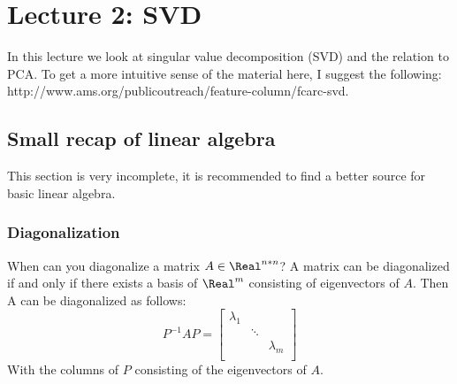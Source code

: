 \chapter{Lecture 2: SVD}
In this lecture we look at singular value decomposition (SVD) and the relation to PCA. To get a more intuitive sense of the material here, I suggest the following: http://www.ams.org/publicoutreach/feature-column/fcarc-svd.
\section{Small recap of linear algebra}
This section is very incomplete, it is recommended to find a better source for basic linear algebra.
\subsection{Diagonalization}
When can you diagonalize a matrix $A \in \Real^{n*n}$? A matrix can be diagonalized if and only if there exists a basis of $\Real^m$ consisting of eigenvectors of $A$. Then A can be diagonalized as follows:
\begin{equation}
\label{eq:diag}
P^{-1}AP = \begin{bmatrix}
			\lambda_1 & & \\
			&\ddots & \\
			&& \lambda_m\\
			\end{bmatrix}
\end{equation}
With the columns of $P$ consisting of the eigenvectors of $A$.
